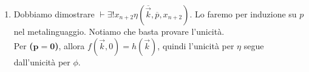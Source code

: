 \begin{itemize}
\begin{enumerate}
         Ora, per $0<i\leq p-1$, valgono $\beta(b,c,i)=r_{i}=f(\vec{k},i)$ e $\beta(b,c,i+1)=r_{i+1}=f(\vec{k},i+1)=g(\vec{k},i,r_{i})$. Quindi, usando l'ipotesi induttiva, si ha:
         $$ \prooftree
         \[ \vdash Bt(\overline{b},\overline{c},\overline{i},\overline{r}_{i}) \quad
         \vdash Bt(\overline{b},\overline{c},\overline{i+1},\overline{r}_{i+1}) \quad
         \vdash \psi(\overline{\vec{k}},\overline{i},\overline{r}_{i},\overline{r}_{i+1})
         \justifies
         \vdash Bt(\overline{b},\overline{c},\overline{i},\overline{r}_{i}) \land Bt(\overline{b},\overline{c},\overline{i+1},\overline{r}_{i+1}) \land \psi(\overline{\vec{k}},\overline{i},\overline{r}_{i},\overline{r}_{i+1}) \]
         \Justifies
         \vdash \exists y \exists z( Bt(\overline{b},\overline{c},\overline{i},y) \land Bt(\overline{b},\overline{c},\overline{i+1},z) \land \psi(\overline{\vec{k}},\overline{i},y,z))
         \endprooftree $$
         per ogni $0<i\leq p-1$. \\
         Utilizzando il il fatto che per ogni numero naturale $p>0$ ed ogni formula $\phi$ si ha $\vdash\phi(0)\land \phi(\overline{1})\land\ldots\land \phi(\overline{p-1}) \leftrightarrow \forall x(x<\overline{p} \to \phi(x))$, otteniamo:
         $$ \vdash \forall w(w<p \to \exists y \exists z( Bt(\overline{b},\overline{c},\overline{i},y) \land Bt(\overline{b},\overline{c},\overline{i+1},z) \land \psi(\overline{\vec{k}},\overline{i},y,z))) $$
         A questo punto basta unire i risultati ottenuti e utilizzando l'$\land$-formazione e l'$\exists$-formazione si arriva al risultato voluto:
         $$\vdash \eta(\overline{\vec{k}}, \overline{p}, \overline{m})$$ \\
    \item Dobbiamo dimostrare $\vdash \exists ! x_{n+2} \eta(\overline{\vec{k}},\overline{p},x_{n+2})$. Lo faremo per induzione su $p$ nel metalinguaggio. Notiamo che basta provare l'unicit\`a. \\
        Per \textbf{($\mathbf{p=0}$)}, allora $f(\vec{k},0)=h(\vec{k})$, quindi l'unicit\`a per $\eta$ segue dall'unicit\`a per $\phi$.


\end{enumerate}
\end{itemize}
